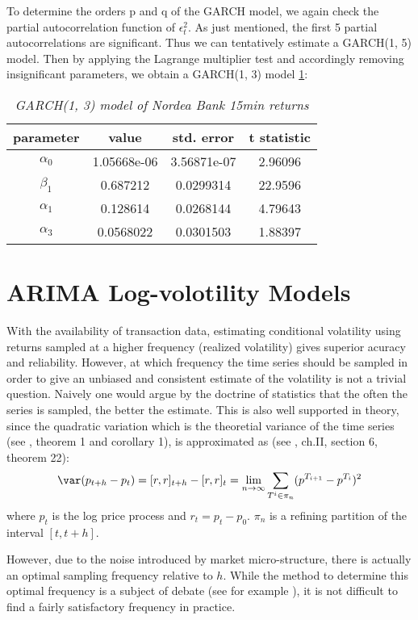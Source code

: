 To determine the orders p and q of the GARCH model, we again check
the partial autocorrelation function of $\epsilon_t^2$. As just
mentioned, the first 5 partial autocorrelations are significant. Thus
we can tentatively estimate a GARCH(1, 5) model. Then by applying the
Lagrange multiplier test and accordingly removing insignificant
parameters, we obtain a GARCH(1, 3) model
\ref{tab:nordea_15min_garch}:
\begin{table}[htb!]
  \centering
  \begin{tabular}{|c|c|c|c|}
    \hline
    parameter & value & std. error & t statistic \\
    \hline
     $\alpha_0$ &   1.05668e-06 &   3.56871e-07 &    2.96096\\
     \hline
     $\beta_1$  &     0.687212  &   0.0299314   &    22.9596\\
     \hline
     $\alpha_1$ &      0.128614 &   0.0268144   &    4.79643\\
     \hline
     $\alpha_3$ &    0.0568022  &   0.0301503   &    1.88397 \\
     \hline
  \end{tabular}
  \caption{\small \it GARCH(1, 3) model of Nordea Bank 15min returns}
  \label{tab:nordea_15min_garch}
\end{table}

\section{ARIMA Log-volotility Models}\label{sec:SLV_model}
With the availability of transaction data, estimating conditional
volatility using returns sampled at a higher frequency (realized
volatility) gives superior acuracy and reliability. However, at which
frequency the time series should be sampled in order to give an
unbiased and consistent estimate of the volatility is not a trivial
question. Naively one would argue by the doctrine of statistics that
the often the series is sampled, the better the estimate. This is also
well supported in theory, since the quadratic variation which is the
theoretial variance of the time series (see \cite{Andersen03}, theorem
1 and corollary 1), is approximated as (see \cite{Protter05}, ch.II,
section 6, theorem 22):
\[
\var(p_{t+h} - p_t) = [r, r]_{t+h} - [r, r]_t = \lim_{n \to \infty}
\sum_{T^i \in \pi_n} (p^{T_{i+1}} - p^{T_i})^2
\]
where $p_t$ is the log price process and $r_t = p_t - p_0$. $\pi_n$
is a refining partition of the interval $[t, t+h]$.

However, due to the noise introduced by market micro-structure, there
is actually an optimal sampling frequency relative to $h$. While the
method to determine this optimal frequency is a subject of debate (see
for example \cite{Sahalia05}), it is not difficult to find a fairly
satisfactory frequency in practice.

